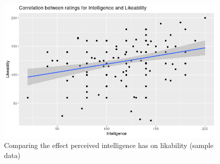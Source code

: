 \documentclass{IEEEtran}
\begin{document}
\begin{figure}
  \centering
  \includegraphics[width=\linewidth]{Images/Graphs/IntelligenceLikabilityRplot.png}
  
\caption{Comparing the effect perceived intelligence has on likability (sample data)}
\label{fig:IntelligenceLikabilityRplot}
\end{figure}
\end{document}
